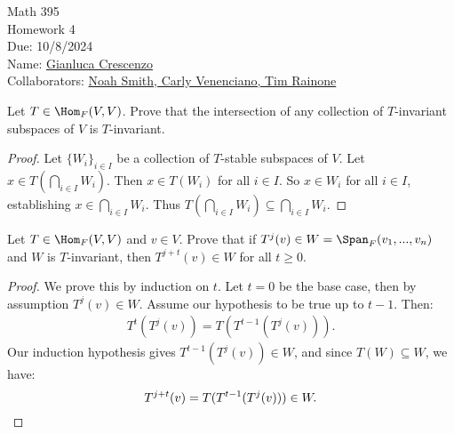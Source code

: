 \documentclass[10pt,twoside,openany]{memoir}
\begin{document}
\begin{center}
    { \Large Math 395 \\[0.1in]Homework 4 \\[0.1in]
    Due: 10/8/2024}\\[.25in]
    { Name:} {\underline{Gianluca Crescenzo\hspace*{2in}}}\\[0.15in]
    { Collaborators:} {\underline{Noah Smith, Carly Venenciano, Tim Rainone \hspace*{2in}}} \\
    \end{center}
    \vspace{4pt}
    \begin{exercise}
        Let $T \in \Hom_F{(V,V)}$. Prove that the intersection of any collection of $T$-invariant subspaces of $V$ is $T$-invariant.
    \end{exercise}
        \begin{proof}
            Let $\{W_i\}_{i \in I}$ be a collection of $T$-stable subspaces of $V$. Let $x \in T \left(\bigcap_{i \in I}W_i\right)$. Then $x \in T(W_i)$ for all $i \in I$. So $x \in W_i$ for all $i \in I$, establishing $x \in \bigcap_{i \in I}W_i$. Thus $T \left(\bigcap_{i \in I}W_i\right) \subseteq \bigcap_{i \in I}W_i$.
        \end{proof}
    \begin{exercise}
        Let $T \in \Hom_F{(V,V)}$ and $v \in V$. Prove that if $T^j(v) \in W = \Span_F{(v_1,...,v_n)}$ and $W$ is $T$-invariant, then $T^{j+t}(v) \in W$ for all $t \geq 0$.
    \end{exercise}
        \begin{proof}
            We prove this by induction on $t$. Let $t = 0$ be the base case, then by assumption $T^j(v) \in W$. Assume our hypothesis to be true up to $t - 1$. Then:
                \begin{equation*}
                \begin{split}
                    T^t(T^j(v)) = T(T^{t-1}(T^j(v))).
                \end{split}
                \end{equation*}
            Our induction hypothesis gives $T^{t-1}(T^j(v)) \in W$, and since $T(W) \subseteq W$, we have:
                \begin{equation*}
                    T^{j+t}(v) = T(T^{t-1}(T^j(v))) \in W.\qedhere
                \end{equation*}
        \end{proof}
\end{document}
